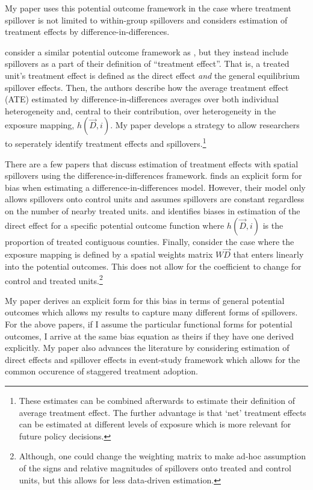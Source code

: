 \documentclass[11pt]{article}
\begin{document}
My paper uses this potential outcome framework in the case where treatment spillover is not limited to within-group spillovers and considers estimation of treatment effects by difference-in-differences. 

\citet{Sävje_Aronow_Hudgens_2019} consider a similar potential outcome framework as \citet{Vazquez-Bare_2019}, but they instead include spillovers as a part of their definition of ``treatment effect''. That is, a treated unit's treatment effect is defined as the direct effect \textit{and} the general equilibrium spillover effects. Then, the authors describe how the average treatment effect (ATE) estimated by difference-in-differences averages over both individual heterogeneity and, central to their contribution, over heterogeneity in the exposure mapping, $h(\vec{D}, i)$. My paper develops a strategy to allow researchers to seperately identify treatment effects and spillovers.\footnote{These estimates can be combined afterwards to estimate their definition of average treatment effect. The further advantage is that `net' treatment effects can be estimated at different levels of exposure which is more relevant for future policy decisions.}

There are a few papers that discuss estimation of treatment effects with spatial spillovers using the difference-in-differences framework. \citet{Clarke_2017} finds an explicit form for bias when estimating a difference-in-differences model. However, their model only allows spillovers onto control units and assumes spillovers are constant regardless on the number of nearby treated units. \citet{Berg_Streitz_2019} and \citet{Verbitsky-Savitz_Raudenbush_2012} identifies biases in estimation of the direct effect for a specific potential outcome function where $h(\vec{D}, i)$ is the proportion of treated contiguous counties. Finally, \citet{Delgado_Florax_2015} consider the case where the exposure mapping is defined by a spatial weights matrix $W\vec{D}$ that enters linearly into the potential outcomes. This does not allow for the coefficient to change for control and treated units.\footnote{Although, one could change the weighting matrix to make ad-hoc assumption of the signs and relative magnitudes of spillovers onto treated and control units, but this allows for less data-driven estimation.}

My paper derives an explicit form for this bias in terms of general potential outcomes which allows my results to capture many different forms of spillovers. For the above papers, if I assume the particular functional forms for potential outcomes, I arrive at the same bias equation as theirs if they have one derived explicitly. My paper also advances the literature by considering estimation of direct effects and spillover effects in event-study framework which allows for the common occurence of staggered treatment adoption.
\end{document}
